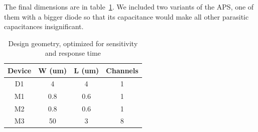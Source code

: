 The final dimensions are in table~\ref{fig:areas_aps}.
We included two variants of the APS,
one of them with a bigger diode
so that its capacitance would make all other parasitic capacitances insignificant.
\begin{table}[h]
    \centering
    \caption{Design geometry, optimized for sensitivity and response time}
    \begin{tabular}{|c|c|c|c|}
        \hline
        Device&      W (um)&    L (um)&  Channels\\
        \hline
D1&     4&  4&  1\\
M1&     0.8&    0.6&    1\\
M2&     0.8&    0.6&    1\\
M3&     50& 3&  8\\
        \hline
    \end{tabular}
    \label{fig:areas_aps}
\end{table}

